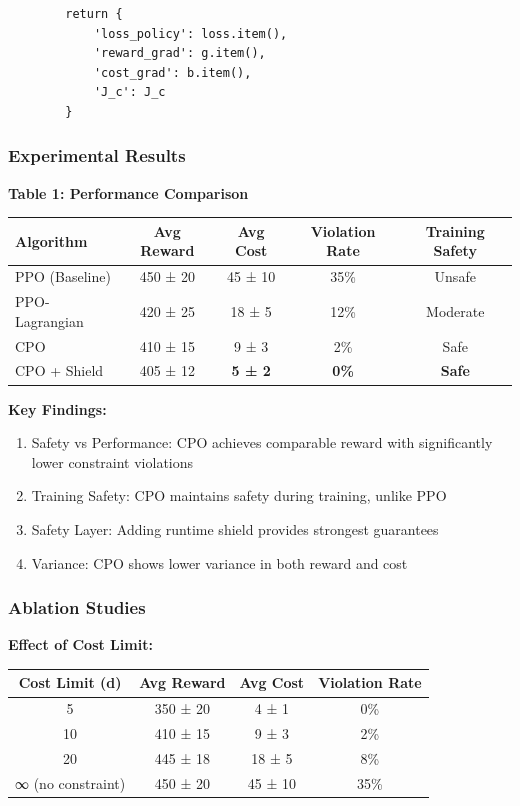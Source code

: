\documentclass[12pt]{article}
\begin{document}
{{{{\begin{verbatim}
        return {
            'loss_policy': loss.item(),
            'reward_grad': g.item(),
            'cost_grad': b.item(),
            'J_c': J_c
        }
\end{verbatim}

\subsubsection{Experimental Results}

\textbf{Table 1: Performance Comparison}

\begin{center}
\begin{tabular}{|l|c|c|c|c|}
\hline
Algorithm & Avg Reward & Avg Cost & Violation Rate & Training Safety \\
\hline
PPO (Baseline) & 450 ± 20 & 45 ± 10 & 35\% & Unsafe \\
PPO-Lagrangian & 420 ± 25 & 18 ± 5 & 12\% & Moderate \\
CPO & 410 ± 15 & 9 ± 3 & 2\% & Safe \\
CPO + Shield & 405 ± 12 & \textbf{5 ± 2} & \textbf{0\%} & \textbf{Safe} \\
\hline
\end{tabular}
\end{center}

\textbf{Key Findings:}
\begin{enumerate}
\item Safety vs Performance: CPO achieves comparable reward with significantly lower constraint violations
\item Training Safety: CPO maintains safety during training, unlike PPO
\item Safety Layer: Adding runtime shield provides strongest guarantees
\item Variance: CPO shows lower variance in both reward and cost
\end{enumerate}

\subsubsection{Ablation Studies}

\textbf{Effect of Cost Limit:}

\begin{center}
\begin{tabular}{|c|c|c|c|}
\hline
Cost Limit (d) & Avg Reward & Avg Cost & Violation Rate \\
\hline
5 & 350 ± 20 & 4 ± 1 & 0\% \\
10 & 410 ± 15 & 9 ± 3 & 2\% \\
20 & 445 ± 18 & 18 ± 5 & 8\% \\
∞ (no constraint) & 450 ± 20 & 45 ± 10 & 35\% \\
\hline
\end{tabular}
\end{center}

}}}}
\end{document}

